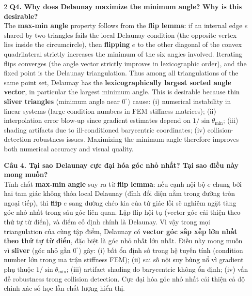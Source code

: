 \begin{paracol}{2}
\textbf{Q4. Why does Delaunay maximize the minimum angle? Why is this desirable?}\\
The \textbf{max-min angle} property follows from the \textbf{flip lemma}: if an internal edge $e$ shared by two triangles fails the local Delaunay condition (the opposite vertex lies inside the circumcircle), then \textbf{flipping} $e$ to the other diagonal of the convex quadrilateral strictly increases the minimum of the six angles involved. Iterating flips converges (the angle vector strictly improves in lexicographic order), and the fixed point is the Delaunay triangulation. Thus among all triangulations of the same point set, Delaunay has the \textbf{lexicographically largest sorted angle vector}, in particular the largest minimum angle. This is desirable because thin \textbf{sliver triangles} (minimum angle near $0^\circ$) cause: (i) numerical instability in linear systems (large condition numbers in FEM stiffness matrices); (ii) interpolation error blow-up since gradient estimates depend on $1/\sin\theta_{\min}$; (iii) shading artifacts due to ill-conditioned barycentric coordinates; (iv) collision-detection robustness issues. Maximizing the minimum angle therefore improves both numerical accuracy and visual quality.

\switchcolumn

\textbf{Câu 4. Tại sao Delaunay cực đại hóa góc nhỏ nhất? Tại sao điều này mong muốn?}\\
Tính chất \textbf{max-min angle} suy ra từ \textbf{flip lemma}: nếu cạnh nội bộ $e$ chung bởi hai tam giác không thỏa local Delaunay (đỉnh đối diện nằm trong đường tròn ngoại tiếp), thì \textbf{flip} $e$ sang đường chéo kia của tứ giác lồi sẽ nghiêm ngặt tăng góc nhỏ nhất trong sáu góc liên quan. Lặp flip hội tụ (vector góc cải thiện theo thứ tự từ điển), và điểm cố định chính là Delaunay. Vì vậy trong mọi triangulation của cùng tập điểm, Delaunay có \textbf{vector góc sắp xếp lớn nhất theo thứ tự từ điển}, đặc biệt là góc nhỏ nhất lớn nhất. Điều này mong muốn vì \textbf{sliver} (góc nhỏ gần $0^\circ$) gây: (i) bất ổn định số trong hệ tuyến tính (condition number lớn trong ma trận stiffness FEM); (ii) sai số nội suy bùng nổ vì gradient phụ thuộc $1/\sin\theta_{\min}$; (iii) artifact shading do barycentric không ổn định; (iv) vấn đề robustness trong collision detection. Cực đại hóa góc nhỏ nhất cải thiện cả độ chính xác số học lẫn chất lượng hiển thị.

\switchcolumn*


\end{paracol}

